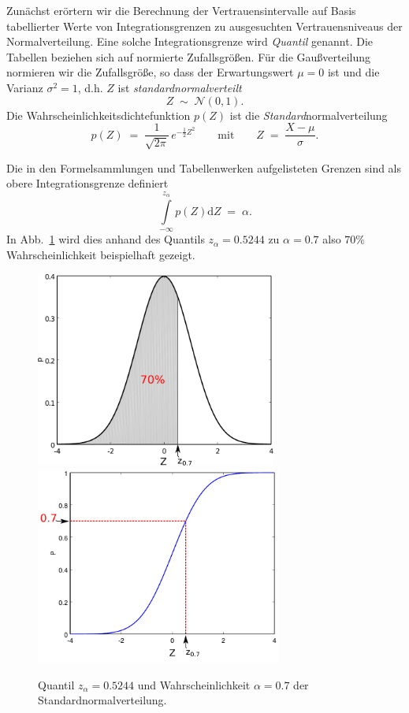 Zunächst erörtern wir die Berechnung der Vertrauensintervalle auf Basis
tabellierter Werte von Integrationsgrenzen zu ausgesuchten Ver\-trauens\-niveaus
der Normalverteilung. Eine solche Integrationsgrenze wird \textsl{Quantil}
genannt. Die Tabellen beziehen sich auf normierte Zufallsgrößen.
Für die Gaußverteilung normieren wir die Zufallsgröße, so dass der
Erwartungswert $\mu = 0$ ist und die Varianz $\sigma^2 = 1$, d.h.
$Z$ ist \textsl{standardnormalverteilt}
\begin{equation}
Z \; \sim \; \mathcal{N}(0,1) .
\label{standardNormalverteilt}
\end{equation}
Die Wahrscheinlichkeitsdichtefunktion $p(Z)$ ist die \textsl{Standard}normalverteilung 
\begin{equation}
p(Z) \; = \; \frac{1}{\sqrt{2 \pi}} \, e^{-\frac{1}{2} Z^2}
\qquad \textrm{mit} \qquad Z \; = \; \frac{X - \mu}{\sigma} .
\end{equation}

Die in den Formelsammlungen und Tabellenwerken aufgelisteten Grenzen sind
als obere Integrationsgrenze definiert
\begin{equation}
\int\limits_{-\infty}^{z_\alpha} p(Z) \mathrm{d} Z \; = \; \alpha .
\label{WahrscheinlichkeitQuantil}
\end{equation}
In Abb.~\ref{normVertQuantil} wird dies anhand des Quantils $z_\alpha = 0.5244$ 
zu $\alpha = 0.7$ also $70 \%$ Wahrscheinlichkeit beispielhaft gezeigt.

\begin{figure}
\begin{center}
\includegraphics[width=79mm]{05_vorlesung/media/normpdfQuantil.pdf}
\hspace{5mm}
\includegraphics[width=81mm]{05_vorlesung/media/normcdfQuantil.pdf}
\caption{\label{normVertQuantil} Quantil $z_\alpha = 0.5244$ und Wahrscheinlichkeit 
$\alpha = 0.7$ der Standard\-normalverteilung.}
\end{center}
\end{figure}

